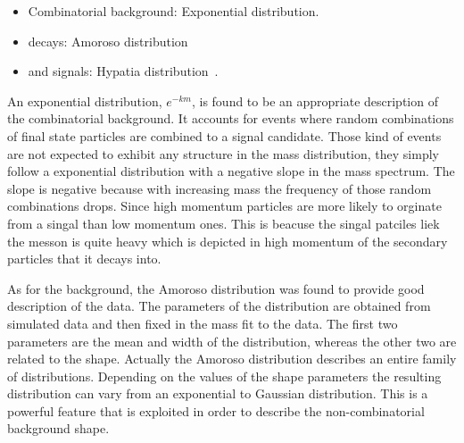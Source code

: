 \begin{itemize}
\item Combinatorial background: Exponential distribution.
\item \LbJpsippi decays: Amoroso distribution~\cite{Amoroso}
\item \Bd and \Bs signals: Hypatia distribution~\cite{Santos:2013gra}.
\end{itemize}

\noindent An exponential distribution, $e^{-km}$, is found to be an appropriate description of the combinatorial background. It  accounts
for events where random combinations of final state particles are combined to a signal candidate. Those kind of events are not expected to
exhibit any structure in the mass distribution, they simply follow a exponential distribution with a negative slope in the mass spectrum.
The slope is negative because with increasing mass the frequency of those random combinations drops. Since high momentum particles are more
likely to orginate from a singal than low momentum ones. This is beacuse the singal patciles liek the \Bs messon is quite heavy which is
depicted in high momentum of the secondary particles that it decays into.

As for the \LbJpsippi background, the Amoroso distribution was found to provide good description of the data.
The parameters of the distribution are obtained from simulated data and then fixed in the mass fit to the data. The first two parameters
are the mean and width of the distribution, whereas the other two are related to the shape. Actually the Amoroso distribution describes
an entire family of distributions. Depending on the values of the shape parameters the resulting distribution can vary from an exponential
to Gaussian distribution. This is a powerful feature that is exploited in order to describe the \LbJpsippi non-combinatorial background shape.

